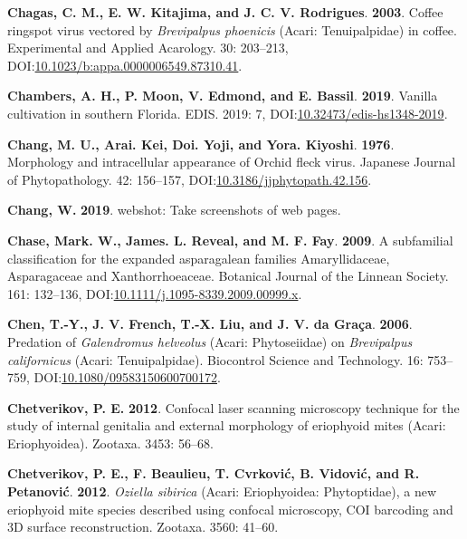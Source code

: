 \documentclass[12pt,final,CPage]{ufthesis}
\newlength{\cslhangindent}
\newenvironment{CSLReferences}[2] %
{%
	\setlength{\parindent}{0pt}
	\ifodd #1 \everypar{\setlength{\hangindent}{\cslhangindent}}\ignorespaces\fi
	\ifnum #2 > 0
	\setlength{\parskip}{#2\baselineskip}
	\fi
}%
{}
\begin{document}
{\begin{CSLReferences}{1}{0}
  \leavevmode{}%
  \textbf{Chagas, C. M., E. W. Kitajima, and J. C. V. Rodrigues}. \textbf{2003}. {Coffee ringspot virus} vectored by {\emph{Brevipalpus phoenicis}} ({Acari}: {Tenuipalpidae}) in coffee. Experimental and Applied Acarology. 30: 203--213, DOI:\href{https://doi.org/10.1023/b:appa.0000006549.87310.41}{10.1023/b:appa.0000006549.87310.41}.

  \leavevmode{}%
  \textbf{Chambers, A. H., P. Moon, V. Edmond, and E. Bassil}. \textbf{2019}. Vanilla cultivation in southern {Florida}. {EDIS}. 2019: 7, DOI:\href{https://doi.org/10.32473/edis-hs1348-2019}{10.32473/edis-hs1348-2019}.

  \leavevmode{}%
  \textbf{Chang, M. U., Arai. Kei, Doi. Yoji, and Yora. Kiyoshi}. \textbf{1976}. Morphology and intracellular appearance of {Orchid fleck virus}. Japanese Journal of Phytopathology. 42: 156--157, DOI:\href{https://doi.org/10.3186/jjphytopath.42.156}{10.3186/jjphytopath.42.156}.

  \leavevmode{}%
  \textbf{Chang, W.} \textbf{2019}. {webshot:} Take screenshots of web pages.

  \leavevmode{}%
  \textbf{Chase, Mark. W., James. L. Reveal, and M. F. Fay}. \textbf{2009}. A subfamilial classification for the expanded asparagalean families {Amaryllidaceae}, {Asparagaceae} and {Xanthorrhoeaceae}. Botanical Journal of the Linnean Society. 161: 132--136, DOI:\href{https://doi.org/10.1111/j.1095-8339.2009.00999.x}{10.1111/j.1095-8339.2009.00999.x}.

  \leavevmode{}%
  \textbf{Chen, T.-Y., J. V. French, T.-X. Liu, and J. V. da Graça}. \textbf{2006}. Predation of {\emph{Galendromus helveolus}} ({Acari}: {Phytoseiidae}) on {\emph{Brevipalpus californicus}} ({Acari}: {Tenuipalpidae}). Biocontrol Science and Technology. 16: 753--759, DOI:\href{https://doi.org/10.1080/09583150600700172}{10.1080/09583150600700172}.

  \leavevmode{}%
  \textbf{Chetverikov, P. E.} \textbf{2012}. Confocal laser scanning microscopy technique for the study of internal genitalia and external morphology of eriophyoid mites ({Acari}: {Eriophyoidea}). Zootaxa. 3453: 56--68.

  \leavevmode{}%
  \textbf{Chetverikov, P. E., F. Beaulieu, T. Cvrković, B. Vidović, and R. Petanović}. \textbf{2012}. {\emph{Oziella sibirica}} ({Acari}: {Eriophyoidea}: {Phytoptidae}), a new eriophyoid mite species described using confocal microscopy, {COI} barcoding and {3D} surface reconstruction. Zootaxa. 3560: 41--60.


\end{CSLReferences}}
\end{document}
